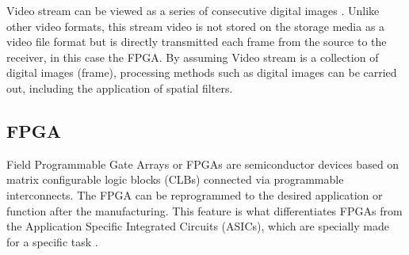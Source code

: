 Video stream can be viewed as a series of consecutive digital images \cite{thesis:jin}. Unlike other video formats, this stream video is not stored on the storage media as a video file format but is directly transmitted each frame from the source to the receiver, in this case the FPGA. By assuming Video stream is a collection of digital images (frame), processing methods such as digital images can be carried out, including the application of spatial filters.


\subsection{FPGA}

Field Programmable Gate Arrays or FPGAs are semiconductor devices based on matrix configurable logic blocks (CLBs) connected via programmable interconnects. The FPGA can be reprogrammed to the desired application or function after the manufacturing. This feature is what differentiates FPGAs from the Application Specific Integrated Circuits (ASICs), which are specially made for a specific task \cite{XILINX}.


